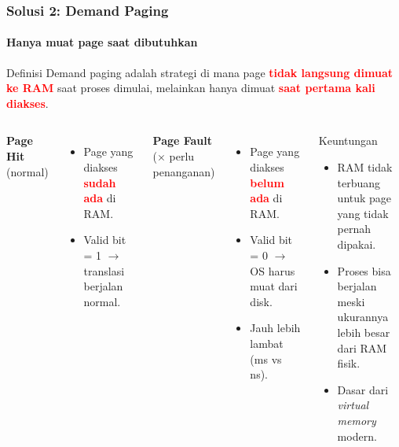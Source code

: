 \documentclass[t,aspectratio=169,xcolor=dvipsnames]{beamer}
\newcommand{\tem}[1]{\textbf{\textcolor{red}{#1}}}
\begin{document}
\begin{frame}
    \frametitle{Solusi 2: Demand Paging}
    \framesubtitle{Hanya muat page saat dibutuhkan}
    \footnotesize

    \begin{block}{Definisi}
        Demand paging adalah strategi di mana page \tem{tidak langsung dimuat ke RAM} saat proses
        dimulai, melainkan hanya dimuat \tem{saat pertama kali diakses}.
    \end{block}

    \vspace{0.15cm}
    \begin{columns}[T]
        \textbf{Page Hit} (\checkmark normal)
        \begin{itemize}
            \item Page yang diakses \tem{sudah ada} di RAM.
            \item Valid bit = 1 $\rightarrow$ translasi berjalan normal.
        \end{itemize}

        \vspace{0.2cm}
        \textbf{Page Fault} ($\times$ perlu penanganan)
        \begin{itemize}
            \item Page yang diakses \tem{belum ada} di RAM.
            \item Valid bit = 0 $\rightarrow$ OS harus muat dari disk.
            \item Jauh lebih lambat (ms vs ns).
        \end{itemize}

        \begin{exampleblock}{Keuntungan}
            \begin{itemize}
                \item RAM tidak terbuang untuk page yang tidak pernah dipakai.
                \item Proses bisa berjalan meski ukurannya lebih besar dari RAM fisik.
                \item Dasar dari \textit{virtual memory} modern.
            \end{itemize}
        \end{exampleblock}
    \end{columns}
\end{frame}

\end{document}
